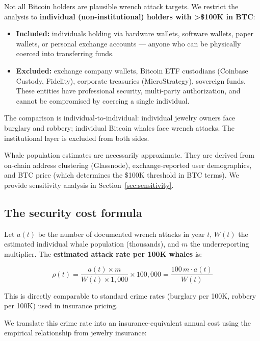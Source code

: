 \documentclass[a4paper,11pt]{article}
\begin{document}
Not all Bitcoin holders are plausible wrench attack targets. We restrict the analysis to \textbf{individual (non-institutional) holders with >\$100K in BTC}:

\begin{itemize}[nosep,leftmargin=1.5em]
  \item \textbf{Included:} individuals holding via hardware wallets, software wallets, paper wallets, or personal exchange accounts --- anyone who can be physically coerced into transferring funds.
  \item \textbf{Excluded:} exchange company wallets, Bitcoin ETF custodians (Coinbase Custody, Fidelity), corporate treasuries (MicroStrategy), sovereign funds. These entities have professional security, multi-party authorization, and cannot be compromised by coercing a single individual.
\end{itemize}

\noindent The comparison is individual-to-individual: individual jewelry owners face burglary and robbery; individual Bitcoin whales face wrench attacks. The institutional layer is excluded from both sides.

Whale population estimates are necessarily approximate. They are derived from on-chain address clustering (Glassnode), exchange-reported user demographics, and BTC price (which determines the \$100K threshold in BTC terms). We provide sensitivity analysis in Section~\ref{sec:sensitivity}.

\subsection{The security cost formula}

Let $a(t)$ be the number of documented wrench attacks in year $t$, $W(t)$ the estimated individual whale population (thousands), and $m$ the underreporting multiplier. The \textbf{estimated attack rate per 100K whales} is:

\begin{equation}
  \rho(t) = \frac{a(t) \times m}{W(t) \times 1{,}000} \times 100{,}000 = \frac{100\, m \cdot a(t)}{W(t)}
  \label{eq:rate}
\end{equation}

\noindent This is directly comparable to standard crime rates (burglary per 100K, robbery per 100K) used in insurance pricing.

\medskip
\noindent We translate this crime rate into an insurance-equivalent annual cost using the empirical relationship from jewelry insurance:
\end{document}
